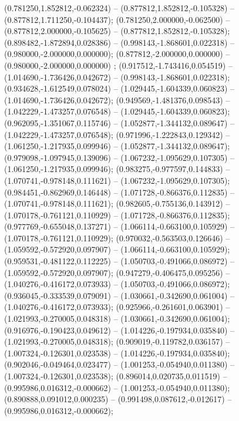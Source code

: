  (0.781250,1.852812,-0.062324) -- (0.877812,1.852812,-0.105328) -- (0.877812,1.711250,-0.104437);
 (0.781250,2.000000,-0.062500) -- (0.877812,2.000000,-0.105625) -- (0.877812,1.852812,-0.105328);
 (0.898482,-1.872894,0.028386) -- (0.998143,-1.868601,0.022318) -- (0.980000,-2.000000,0.000000);
 (0.877812,-2.000000,0.000000) -- (0.980000,-2.000000,0.000000) ;
 (0.917512,-1.743416,0.054519) -- (1.014690,-1.736426,0.042672) -- (0.998143,-1.868601,0.022318);
 (0.934628,-1.612549,0.078024) -- (1.029445,-1.604339,0.060823) -- (1.014690,-1.736426,0.042672);
 (0.949569,-1.481376,0.098543) -- (1.042229,-1.473257,0.076548) -- (1.029445,-1.604339,0.060823);
 (0.962095,-1.351067,0.115746) -- (1.052877,-1.344132,0.089647) -- (1.042229,-1.473257,0.076548);
 (0.971996,-1.222843,0.129342) -- (1.061250,-1.217935,0.099946) -- (1.052877,-1.344132,0.089647);
 (0.979098,-1.097945,0.139096) -- (1.067232,-1.095629,0.107305) -- (1.061250,-1.217935,0.099946);
 (0.983275,-0.977597,0.144833) -- (1.070741,-0.978148,0.111621) -- (1.067232,-1.095629,0.107305);
 (0.984451,-0.862969,0.146448) -- (1.071728,-0.866376,0.112835) -- (1.070741,-0.978148,0.111621);
 (0.982605,-0.755136,0.143912) -- (1.070178,-0.761121,0.110929) -- (1.071728,-0.866376,0.112835);
 (0.977769,-0.655048,0.137271) -- (1.066114,-0.663100,0.105929) -- (1.070178,-0.761121,0.110929);
 (0.970032,-0.563503,0.126646) -- (1.059592,-0.572920,0.097907) -- (1.066114,-0.663100,0.105929);
 (0.959531,-0.481122,0.112225) -- (1.050703,-0.491066,0.086972) -- (1.059592,-0.572920,0.097907);
 (0.947279,-0.406475,0.095256) -- (1.040276,-0.416172,0.073933) -- (1.050703,-0.491066,0.086972);
 (0.936045,-0.333539,0.079091) -- (1.030661,-0.342690,0.061004) -- (1.040276,-0.416172,0.073933);
 (0.925966,-0.261601,0.063901) -- (1.021993,-0.270005,0.048318) -- (1.030661,-0.342690,0.061004);
 (0.916976,-0.190423,0.049612) -- (1.014226,-0.197934,0.035840) -- (1.021993,-0.270005,0.048318);
 (0.909019,-0.119782,0.036157) -- (1.007324,-0.126301,0.023538) -- (1.014226,-0.197934,0.035840);
 (0.902046,-0.049464,0.023477) -- (1.001253,-0.054940,0.011380) -- (1.007324,-0.126301,0.023538);
 (0.896014,0.020735,0.011519) -- (0.995986,0.016312,-0.000662) -- (1.001253,-0.054940,0.011380);
 (0.890888,0.091012,0.000235) -- (0.991498,0.087612,-0.012617) -- (0.995986,0.016312,-0.000662);
